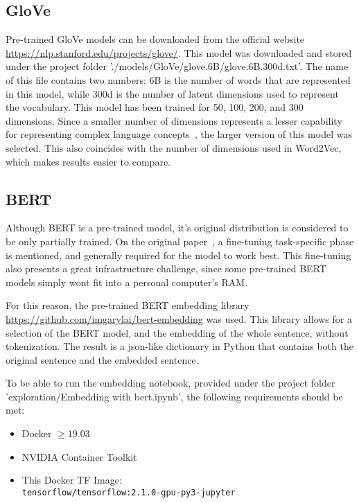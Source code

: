 \subsection{GloVe}\label{sub:GloVe}
Pre-trained GloVe models can be downloaded from the official website \url{https://nlp.stanford.edu/projects/glove/}. This model was downloaded and stored under the project folder './models/GloVe/glove.6B/glove.6B.300d.txt'. The name of this file contains two numbers: 6B is the number of words that are represented in this model, while 300d is the number of latent dimensions used to represent the vocabulary. This model has been trained for 50, 100, 200, and 300 dimensions. Since a smaller number of dimensions represents a lesser capability for representing complex language concepts~\cite{penningto2014glove}, the larger version of this model was selected. This also coincides with the number of dimensions used in Word2Vec, which makes results easier to compare.

\subsection{BERT}\label{sub:BERT}
Although BERT is a pre-trained model, it's original distribution is considered to be only partially trained. On the original paper~\cite{devlin2019bert}, a fine-tuning task-specific phase is mentioned, and generally required for the model to work best. This fine-tuning also presents a great infrastructure challenge, since some pre-trained BERT models simply wont fit into a personal computer's RAM.\@

For this reason, the pre-trained BERT embedding library \url{https://github.com/imgarylai/bert-embedding} was used. This library allows for a selection of the BERT model, and the embedding of the whole sentence, without tokenization. The result is a json-like dictionary in Python that contains both the original sentence and the embedded sentence.

To be able to run the embedding notebook, provided under the project folder 'exploration/Embedding with bert.ipynb', the following requirements should be met:
\begin{itemize}
  \item Docker $\geq19.03$
  \item NVIDIA Container Toolkit
  \item This Docker TF Image: \\ \lstinline{tensorflow/tensorflow:2.1.0-gpu-py3-jupyter}
\end{itemize}


